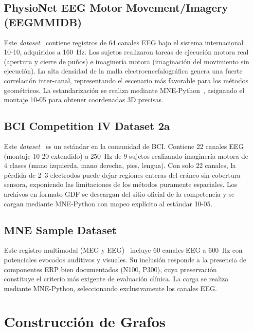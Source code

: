 \subsection{PhysioNet EEG Motor Movement/Imagery (EEGMMIDB)}

Este \textit{dataset}~\cite{goldberger2000physionet,schalk2004bci2000} contiene registros de 64 canales EEG bajo el sistema internacional 10-10, adquiridos a 160~Hz. Los sujetos realizaron tareas de ejecución motora real (apertura y cierre de puños) e imaginería motora (imaginación del movimiento sin ejecución). La alta densidad de la malla electroencefalográfica genera una fuerte correlación inter-canal, representando el escenario más favorable para los métodos geométricos. La estandarización se realiza mediante MNE-Python~\cite{gramfort2013meg}, asignando el montaje 10-05 para obtener coordenadas 3D precisas.

\subsection{BCI Competition IV Dataset 2a}

Este \textit{dataset}~\cite{tangermann2012bci} es un estándar en la comunidad de BCI. Contiene 22 canales EEG (montaje 10-20 extendido) a 250~Hz de 9 sujetos realizando imaginería motora de 4 clases (mano izquierda, mano derecha, pies, lengua). Con solo 22 canales, la pérdida de 2--3 electrodos puede dejar regiones enteras del cráneo sin cobertura sensora, exponiendo las limitaciones de los métodos puramente espaciales. Los archivos en formato GDF se descargan del sitio oficial de la competencia y se cargan mediante MNE-Python con mapeo explícito al estándar 10-05.

\subsection{MNE Sample Dataset}

Este registro multimodal (MEG y EEG)~\cite{gramfort2013meg} incluye 60 canales EEG a 600~Hz con potenciales evocados auditivos y visuales. Su inclusión responde a la presencia de componentes ERP bien documentados (N100, P300), cuya preservación constituye el criterio más exigente de evaluación clínica. La carga se realiza mediante MNE-Python, seleccionando exclusivamente los canales EEG.

\section{Construcción de Grafos}

